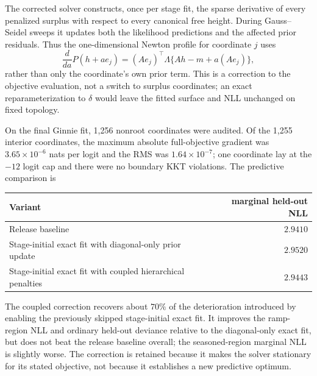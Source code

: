 \documentclass[11pt]{article}
\begin{document}
The corrected solver constructs, once per stage fit, the sparse derivative of every penalized
surplus with respect to every canonical free height. During Gauss--Seidel sweeps it updates both the
likelihood predictions and the affected prior residuals. Thus the one-dimensional Newton profile for
coordinate $j$ uses
\[
\frac{d}{da}P(h+a e_j)
=(Ae_j)^\top\Lambda\{Ah-m+a(Ae_j)\},
\]
rather than only the coordinate's own prior term. This is a correction to the objective evaluation,
not a switch to surplus coordinates; an exact reparameterization to $\delta$ would leave the fitted
surface and NLL unchanged on fixed topology.

On the final Ginnie fit, 1,256 nonroot coordinates were audited. Of the 1,255 interior coordinates,
the maximum absolute full-objective gradient was $3.65\times10^{-6}$ nats per logit and the RMS was
$1.64\times10^{-7}$; one coordinate lay at the $-12$ logit cap and there were no boundary KKT
violations. The predictive comparison is
\begin{center}
\begin{tabular}{@{}lr@{}}
\toprule
Variant & marginal held-out NLL\\
\midrule
Release baseline & $2.9410$\\
Stage-initial exact fit with diagonal-only prior update & $2.9520$\\
Stage-initial exact fit with coupled hierarchical penalties & $2.9443$\\
\bottomrule
\end{tabular}
\end{center}
The coupled correction recovers about $70\%$ of the deterioration introduced by enabling the
previously skipped stage-initial exact fit. It improves the ramp-region NLL and ordinary held-out
deviance relative to the diagonal-only exact fit, but does not beat the release baseline overall;
the seasoned-region marginal NLL is slightly worse. The correction is retained because it makes the
solver stationary for its stated objective, not because it establishes a new predictive optimum.
\end{document}
